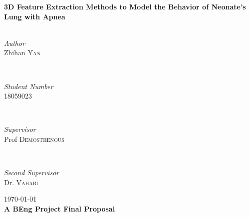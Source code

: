 \begin{titlepage}
	{\huge\bfseries 3D Feature Extraction Methods to Model the Behavior of Neonate’s Lung with Apnea}\\[0.4cm] %
	
	\HRule\\[1.5cm]
	
	
	\begin{minipage}{0.4\textwidth}
		\begin{flushleft}
			\large
			\textit{Author}\\
			Zhihan \textsc{Yan} %
		\end{flushleft}
		  \hfill		
	\end{minipage}
         ~
	\begin{minipage}{0.4\textwidth}
		\begin{flushright}
			\large
			\textit{Student Number}\\
			 \textsc{18059023} %
		\end{flushright}
	\end{minipage}
	~
	\begin{minipage}{0.4\textwidth}
		\begin{flushleft}
			\large
			\textit{Supervisor}\\
			Prof \textsc{Demosthenous} %
		\end{flushleft}
	\end{minipage}
	~
	\begin{minipage}{0.4\textwidth}
		\begin{flushright}
			\large
			\textit{Second Supervisor}\\
			Dr.  \textsc{Vahabi} %
		\end{flushright}
	\end{minipage}
	
	
	\vfill\vfill\vfill %
	
	{\large\today} \\%
	{\large \textbf{A BEng Project Final Proposal}}
	
	 
	
	\vfill %
	
\end{titlepage}


